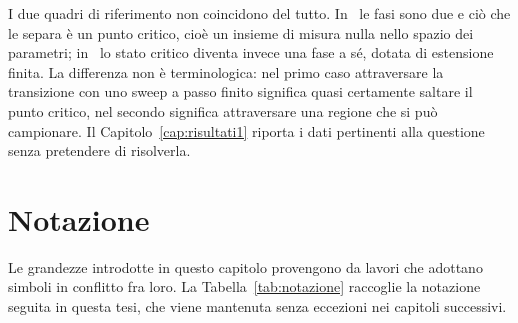 I due quadri di riferimento non coincidono del tutto.
In~\cite{nakaishi2024} le fasi sono due e ciò che le separa è un punto critico,
cioè un insieme di misura nulla nello spazio dei parametri;
in~\cite{mikhaylovskiy2025states} lo stato critico diventa invece una fase a sé,
dotata di estensione finita. La differenza non è terminologica: nel primo caso
attraversare la transizione con uno sweep a passo finito significa quasi
certamente saltare il punto critico, nel secondo significa attraversare una
regione che si può campionare. Il Capitolo~\ref{cap:risultati1} riporta i dati
pertinenti alla questione senza pretendere di risolverla.


\section{Notazione}
\label{sec:notazione}

Le grandezze introdotte in questo capitolo provengono da lavori che adottano
simboli in conflitto fra loro. La Tabella~\ref{tab:notazione} raccoglie la
notazione seguita in questa tesi, che viene mantenuta senza eccezioni nei
capitoli successivi.

